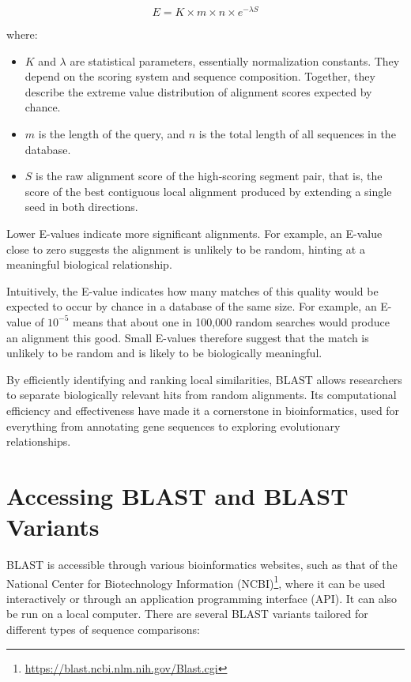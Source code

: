 \begin{enumerate}
    \[
    E = K \times m \times n \times e^{-\lambda S}
    \]

    where:
    \begin{itemize}
        \item \( K \) and \( \lambda \) are statistical parameters, essentially normalization constants. They depend on the scoring system and sequence composition. Together, they describe the extreme value distribution of alignment scores expected by chance.
        \item \( m \) is the length of the query, and \( n \) is the total length of all sequences in the database.
        \item \( S \) is the raw alignment score of the high-scoring segment pair, that is, the score of the best contiguous local alignment produced by extending a single seed in both directions.
    \end{itemize}

    Lower E-values indicate more significant alignments. For example, an E-value close to zero suggests the alignment is unlikely to be random, hinting at a meaningful biological relationship.
\end{enumerate}

Intuitively, the E-value indicates how many matches of this quality would be expected to occur by chance in a database of the same size. For example, an E-value of \(10^{-5}\) means that about one in 100{,}000 random searches would produce an alignment this good. Small E-values therefore suggest that the match is unlikely to be random and is likely to be biologically meaningful.

By efficiently identifying and ranking local similarities, BLAST allows researchers to separate biologically relevant hits from random alignments. Its computational efficiency and effectiveness have made it a cornerstone in bioinformatics, used for everything from annotating gene sequences to exploring evolutionary relationships.

\section{Accessing BLAST and BLAST Variants}

BLAST is accessible through various bioinformatics websites, such as that of the National Center for Biotechnology Information (NCBI)\footnote{\url{https://blast.ncbi.nlm.nih.gov/Blast.cgi}}, where it can be used interactively or through an application programming interface (API). It can also be run on a local computer. There are several BLAST variants tailored for different types of sequence comparisons:

